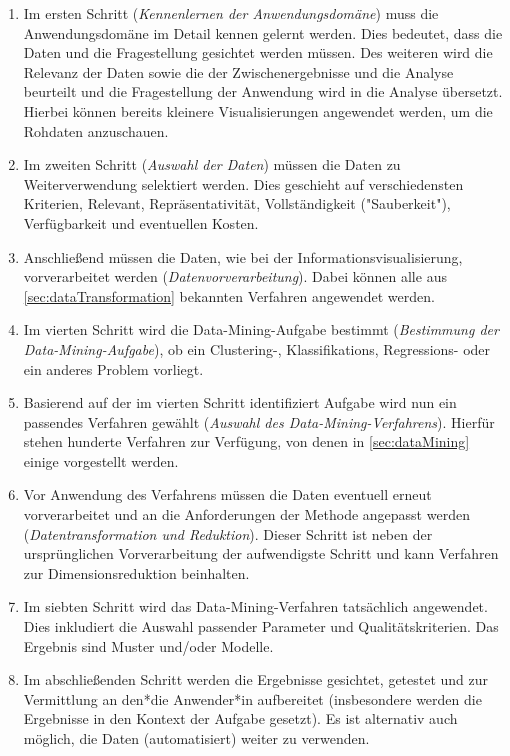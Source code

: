 				\begin{enumerate}
					\item Im ersten Schritt (\emph{Kennenlernen der Anwendungsdomäne}) muss die Anwendungsdomäne im Detail kennen gelernt werden. Dies bedeutet, dass die Daten und die Fragestellung gesichtet werden müssen. Des weiteren wird die Relevanz der Daten sowie die der Zwischenergebnisse und die Analyse beurteilt und die Fragestellung der Anwendung wird in die Analyse übersetzt. Hierbei können bereits kleinere Visualisierungen angewendet werden, \zB um die Rohdaten anzuschauen.
					\item Im zweiten Schritt (\emph{Auswahl der Daten}) müssen die Daten zu Weiterverwendung selektiert werden. Dies geschieht auf verschiedensten Kriterien, \zB Relevant, Repräsentativität, Vollständigkeit ("Sauberkeit"), Verfügbarkeit und eventuellen Kosten.
					\item Anschließend müssen die Daten, wie bei der Informationsvisualisierung, vorverarbeitet werden (\emph{Datenvorverarbeitung}). Dabei können alle aus \autoref{sec:dataTransformation} bekannten Verfahren angewendet werden.
					\item Im vierten Schritt wird die Data-Mining-Aufgabe bestimmt (\emph{Bestimmung der Data-Mining-Aufgabe}), \dh ob ein Clustering-, Klassifikations, Regressions- oder ein anderes Problem vorliegt.
					\item Basierend auf der im vierten Schritt identifiziert Aufgabe wird nun ein passendes Verfahren gewählt (\emph{Auswahl des Data-Mining-Verfahrens}). Hierfür stehen hunderte Verfahren zur Verfügung, von denen in \autoref{sec:dataMining} einige vorgestellt werden.
					\item Vor Anwendung des Verfahrens müssen die Daten eventuell erneut vorverarbeitet und an die Anforderungen der Methode angepasst werden (\emph{Datentransformation und Reduktion}). Dieser Schritt ist neben der ursprünglichen Vorverarbeitung der aufwendigste Schritt und kann \zB Verfahren zur Dimensionsreduktion beinhalten.
					\item Im siebten Schritt wird das Data-Mining-Verfahren tatsächlich angewendet. Dies inkludiert die Auswahl passender Parameter und Qualitätskriterien. Das Ergebnis sind Muster und/oder Modelle.
					\item Im abschließenden Schritt werden die Ergebnisse gesichtet, getestet und zur Vermittlung an den*die Anwender*in aufbereitet (insbesondere werden die Ergebnisse in den Kontext der Aufgabe gesetzt). Es ist alternativ auch möglich, die Daten (automatisiert) weiter zu verwenden.
				\end{enumerate}

